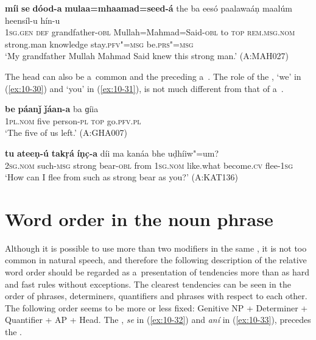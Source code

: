 \ea
\label{ex:10-29}
\gll \textbf{míi} \textbf{se} \textbf{dóod-a} \textbf{mulaa=mhaamad=seed-á} the ba eesó paalawaáṇ maalúm heensíl-u hín-u\\
\textsc{1sg.gen} \textsc{def} grandfather-\textsc{obl} Mullah=Mahmad=Said-\textsc{obl} to  \textsc{top} \textsc{rem.msg.nom} strong.man knowledge  stay.\textsc{pfv"=msg} be.\textsc{prs"=msg}\\
\glt `My grandfather Mullah Mahmad Said knew this strong man.' (A:MAH027)
\z


The head can also be a~common  and the preceding  a~. The role of the , `we' in (\ref{ex:10-30}) and `you' in (\ref{ex:10-31}), is not much different from that of a~. 

\begin{exe}
\ex
\label{ex:10-30}
\gll \textbf{be} \textbf{páanǰ} \textbf{ǰáan-a} ba ɡíia \\
\textsc{1pl.nom} five person-\textsc{pl} \textsc{top} go.\textsc{pfv.pl}  \\
\glt `The five of us left.' (A:GHA007)

\ex
\label{ex:10-31}
\gll \textbf{tu} \textbf{ateeṇ-ú} \textbf{takṛá} \textbf{íṇc̣-a} díi ma kanáa bhe uḍhíiw"=um? \\
\textsc{2sg.nom} such-\textsc{msg} strong bear-\textsc{obl} from \textsc{1sg.nom}  like.what become.\textsc{cv} flee-\textsc{1sg} \\
\glt `How can I flee from such as strong bear as you?' (A:KAT136)
\end{exe}

\section{Word order in the {noun} phrase}
\label{sec:10-2}


Although it is possible to use more than two modifiers in the same  , it is not too common in natural speech, and therefore the following description of the relative word order should be regarded as a~presentation of tendencies more than as hard and fast rules without exceptions. The clearest tendencies can be seen in the order of  phrases, determiners, quantifiers and  phrases with respect to each other. The following order seems to be more or less fixed: Genitive NP + Determiner + Quantifier + AP + Head. The , \textit{se} in (\ref{ex:10-32}) and \textit{aní} in (\ref{ex:10-33}), precedes the .


